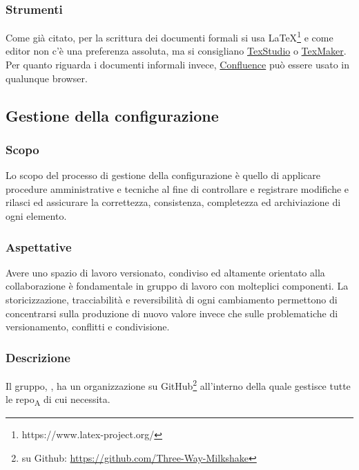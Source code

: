     \subsubsection{Strumenti}
    Come già citato, per la scrittura dei documenti formali si usa \LaTeX\footnote{https://www.latex-project.org/} e come editor non c'è una preferenza assoluta, ma si consigliano \href{http://www.texstudio.org/}{TexStudio} o \href{https://www.xm1math.net/texmaker/}{TexMaker}. Per quanto riguarda i documenti informali invece, \href{https://www.atlassian.com/software/confluence}{Confluence} può essere usato in qualunque browser.

\subsection{Gestione della configurazione}
    \subsubsection{Scopo}
        Lo scopo del processo di gestione della configurazione è quello di applicare procedure amministrative e tecniche al fine di controllare e registrare modifiche e rilasci ed assicurare la correttezza, consistenza, completezza ed archiviazione di ogni elemento.
    \subsubsection{Aspettative}
        Avere uno spazio di lavoro versionato, condiviso ed altamente orientato alla collaborazione è fondamentale in gruppo di lavoro con molteplici componenti. La storicizzazione, tracciabilità e reversibilità di ogni cambiamento permettono di concentrarsi sulla produzione di nuovo valore invece che sulle problematiche di versionamento, conflitti e condivisione.
    \subsubsection{Descrizione}
        Il gruppo, \group, ha un organizzazione su GitHub\footnote{\group su Github: \url{https://github.com/Three-Way-Milkshake}} all'interno della quale gestisce tutte le repo\textsubscript{A} di cui necessita.
